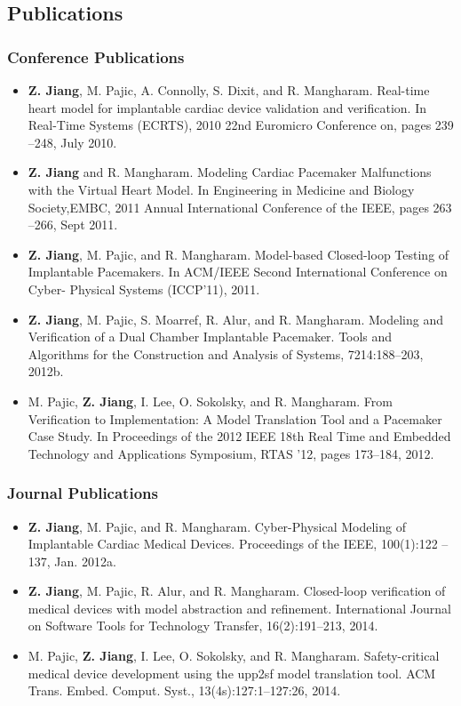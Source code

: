 \documentclass[a4paper]{article}
\begin{document}
\newpage
\subsection{Publications}
\subsubsection{Conference Publications}
\begin{itemize}
\item \textbf{Z. Jiang}, M. Pajic, A. Connolly, S. Dixit, and R. Mangharam. Real-time heart model
for implantable cardiac device validation and verification. In Real-Time Systems
(ECRTS), 2010 22nd Euromicro Conference on, pages 239 –248, July 2010.
\item \textbf{Z. Jiang} and R. Mangharam. Modeling Cardiac Pacemaker Malfunctions with the
Virtual Heart Model. In Engineering in Medicine and Biology Society,EMBC,
2011 Annual International Conference of the IEEE, pages 263 –266, Sept 2011.
\item \textbf{Z. Jiang}, M. Pajic, and R. Mangharam. Model-based Closed-loop Testing of Implantable
Pacemakers. In ACM/IEEE Second International Conference on Cyber-
Physical Systems (ICCP’11), 2011.

\item \textbf{Z. Jiang}, M. Pajic, S. Moarref, R. Alur, and R. Mangharam. Modeling and Verification of a Dual Chamber Implantable Pacemaker. Tools and Algorithms for the
Construction and Analysis of Systems, 7214:188–203, 2012b.
\item M. Pajic, \textbf{Z. Jiang}, I. Lee, O. Sokolsky, and R. Mangharam. From Verification to
Implementation: A Model Translation Tool and a Pacemaker Case Study. In Proceedings
of the 2012 IEEE 18th Real Time and Embedded Technology and Applications
Symposium, RTAS ’12, pages 173–184, 2012.
\end{itemize}
\subsubsection{Journal Publications}
\begin{itemize}
\item \textbf{Z. Jiang}, M. Pajic, and R. Mangharam. Cyber-Physical Modeling of Implantable
Cardiac Medical Devices. Proceedings of the IEEE, 100(1):122 –137, Jan. 2012a.
\item \textbf{Z. Jiang}, M. Pajic, R. Alur, and R. Mangharam. Closed-loop verification of medical
devices with model abstraction and refinement. International Journal on Software
Tools for Technology Transfer, 16(2):191–213, 2014.
\item M. Pajic, \textbf{Z. Jiang}, I. Lee, O. Sokolsky, and R. Mangharam. Safety-critical medical
device development using the upp2sf model translation tool. ACM Trans. Embed.
Comput. Syst., 13(4s):127:1–127:26, 2014.
\end{itemize}
\end{document}
